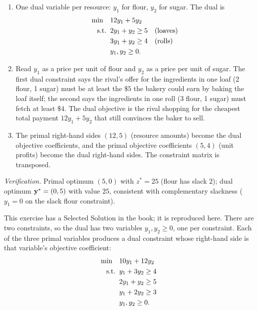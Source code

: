 \begin{enumerate}
\item One dual variable per resource: $y_1$ for flour, $y_2$ for sugar. The dual is
\[
\begin{aligned}
\min \quad & 12y_1 + 5y_2 \\
\text{s.t.}\;\; & 2y_1 + y_2 \ge 5 \quad \text{(loaves)} \\
& 3y_1 + y_2 \ge 4 \quad \text{(rolls)} \\
& y_1, y_2 \ge 0 .
\end{aligned}
\]
\item Read $y_1$ as a price per unit of flour and $y_2$ as a price per unit of sugar. The first dual constraint says the rival's offer for the ingredients in one loaf (2 flour, 1 sugar) must be at least the $\$5$ the bakery could earn by baking the loaf itself; the second says the ingredients in one roll (3 flour, 1 sugar) must fetch at least $\$4$. The dual objective is the rival shopping for the cheapest total payment $12y_1 + 5y_2$ that still convinces the baker to sell.
\item The primal right-hand sides $(12, 5)$ (resource amounts) become the dual objective coefficients, and the primal objective coefficients $(5, 4)$ (unit profits) become the dual right-hand sides. The constraint matrix is transposed.
\end{enumerate}

\emph{Verification.} Primal optimum $(5, 0)$ with $z^* = 25$ (flour has slack $2$); dual optimum $\mathbf{y}^* = (0, 5)$ with value $25$, consistent with complementary slackness ($y_1 = 0$ on the slack flour constraint).


This exercise has a Selected Solution in the book; it is reproduced here. There are two constraints, so the dual has two variables $y_1, y_2 \geq 0$, one per constraint. Each of the three primal variables produces a dual constraint whose right-hand side is that variable's objective coefficient:
\[
\begin{aligned}
\min \quad & 10y_1 + 12y_2 \\
\text{s.t.}\;\; & y_1 + 3y_2 \ge 4 \\
& 2y_1 + y_2 \ge 5 \\
& y_1 + 2y_2 \ge 3 \\
& y_1, y_2 \ge 0 .
\end{aligned}
\]


